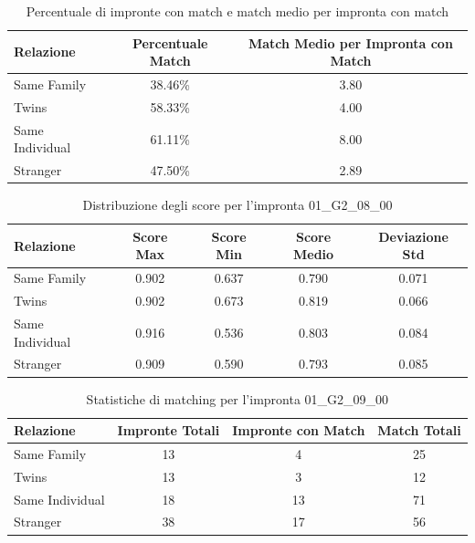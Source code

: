 \begin{table}[htbp]
\centering
\caption{Percentuale di impronte con match e match medio per impronta con match}
\label{tab:match_percentage_01_G2_08_00}
\begin{tabular}{|l|c|c|}
\hline
\textbf{Relazione} & \textbf{Percentuale Match} & \textbf{Match Medio per Impronta con Match} \\
\hline
Same Family & 38.46\% & 3.80 \\
\hline
Twins & 58.33\% & 4.00 \\
\hline
Same Individual & 61.11\% & 8.00 \\
\hline
Stranger & 47.50\% & 2.89 \\
\hline
\end{tabular}
\end{table}


\begin{table}[htbp]
\centering
\caption{Distribuzione degli score per l'impronta 01\_G2\_08\_00}
\label{tab:scores_01_G2_08_00}
\begin{tabular}{|l|c|c|c|c|}
\hline
\textbf{Relazione} & \textbf{Score Max} & \textbf{Score Min} & \textbf{Score Medio} & \textbf{Deviazione Std} \\
\hline
Same Family & 0.902 & 0.637 & 0.790 & 0.071 \\
\hline
Twins & 0.902 & 0.673 & 0.819 & 0.066 \\
\hline
Same Individual & 0.916 & 0.536 & 0.803 & 0.084 \\
\hline
Stranger & 0.909 & 0.590 & 0.793 & 0.085 \\
\hline
\end{tabular}
\end{table}


\begin{table}[htbp]
\centering
\caption{Statistiche di matching per l'impronta 01\_G2\_09\_00}
\label{tab:results_01_G2_09_00}
\begin{tabular}{|l|c|c|c|}
\hline
\textbf{Relazione} & \textbf{Impronte Totali} & \textbf{Impronte con Match} & \textbf{Match Totali} \\
\hline
Same Family & 13 & 4 & 25 \\
\hline
Twins & 13 & 3 & 12 \\
\hline
Same Individual & 18 & 13 & 71 \\
\hline
Stranger & 38 & 17 & 56 \\
\hline
\end{tabular}
\end{table}


